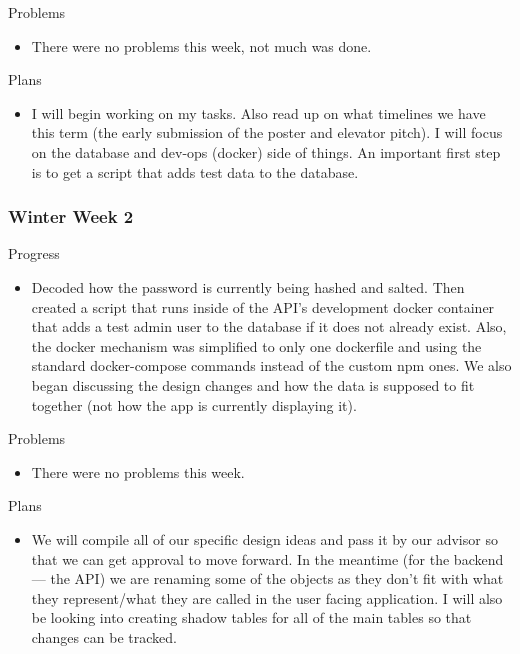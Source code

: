         \noindent
        Problems
        \begin{itemize}
            \item There were no problems this week, not much was done.
        \end{itemize}
        
        \noindent
        Plans
        \begin{itemize}
            \item I will begin working on my tasks.  Also read up on what timelines we have this term (the early submission of the poster and elevator pitch).  I will focus on the database and dev-ops (docker) side of things.  An important first step is to get a script that adds test data to the database.
        \end{itemize}
        
    \subsubsection{Winter Week 2}
    
        \noindent
        Progress
        \begin{itemize}
            \item Decoded how the password is currently being hashed and salted.  Then created a script that runs inside of the API’s development docker container that adds a test admin user to the database if it does not already exist.  Also, the docker mechanism was simplified to only one dockerfile and using the standard docker-compose commands instead of the custom npm ones.  We also began discussing the design changes and how the data is supposed to fit together (not how the app is currently displaying it).
        \end{itemize}
        
        \noindent
        Problems
        \begin{itemize}
            \item There were no problems this week.
        \end{itemize}
        
        \noindent
        Plans
        \begin{itemize}
            \item We will compile all of our specific design ideas and pass it by our advisor so that we can get approval to move forward.  In the meantime (for the backend --- the API) we are renaming some of the objects as they don’t fit with what they represent/what they are called in the user facing application.  I will also be looking into creating shadow tables for all of the main tables so that changes can be tracked.
        \end{itemize}
        
